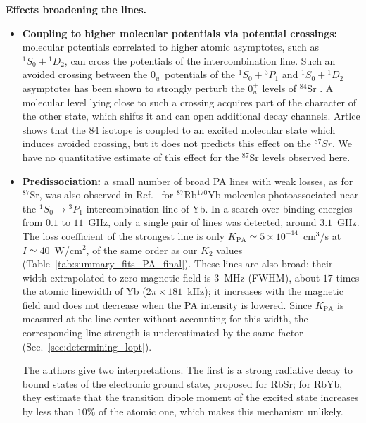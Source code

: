 \textbf{Effects broadening the lines.}
\begin{itemize}
    \item \textbf{Coupling to higher molecular potentials via potential crossings:} molecular
    potentials correlated to higher atomic asymptotes, such as $^1S_0+{}^1D_2$, can cross the
    potentials of the intercombination line. Such an avoided crossing between the $0_u^+$
    potentials of the $^1S_0+{}^3P_1$ and $^1S_0+{}^1D_2$ asymptotes has been shown to strongly
    perturb the $0_u^+$ levels of $^{84}\text{Sr}$ \cite{borkowski_mass_2014,reschovsky_narrow-line_2018}.
    A molecular level lying close to such a crossing acquires part of the character of the
    other state, which shifts it and can open additional decay channels. 
    Artlce \cite{borkowski_mass_2014} shows that the 84 isotope is coupled to an excited molecular 
    state which induces avoided crossing, but it does not predicts this effect on the $^{87}Sr$.
    We have no
    quantitative estimate of this effect for the $^{87}\text{Sr}$ levels observed here.
    \item \textbf{Predissociation:} a small number of broad PA lines with weak losses, as for $^{87}$Sr, was also observed in Ref.~\cite{franzen_intercombination_2023} for $^{87}$Rb$^{170}$Yb
        molecules photoassociated near the $^1S_0\rightarrow{}^3P_1$ intercombination line of Yb.
        In a search over binding energies from $0.1$ to $11$~GHz, only a single pair of lines was detected, around $3.1$~GHz. The loss coefficient of the strongest line is only $K_{\text{PA}}\simeq5\times10^{-14}$~cm$^3$/s at $I\simeq40$~W/cm$^2$,
        of the same order as our $K_2$ values (Table~\ref{tab:summary_fits_PA_final}). These lines are also broad: their width extrapolated to zero magnetic field is $3$~MHz (FWHM), about $17$ times the atomic linewidth of Yb ($2\pi\times181$~kHz); it increases with the magnetic field and does not decrease when the PA intensity is lowered. Since $K_{\text{PA}}$ is measured at the line center without accounting for this width, the corresponding line strength is underestimated by the same factor (Sec.~\ref{sec:determining_lopt}).

        The authors give two interpretations. The first is a strong radiative decay to bound states of the electronic ground state, proposed for RbSr; for RbYb, they estimate that the transition dipole moment of the excited state increases by less than $10\%$ of the atomic one, which makes this mechanism unlikely.


\end{itemize}
